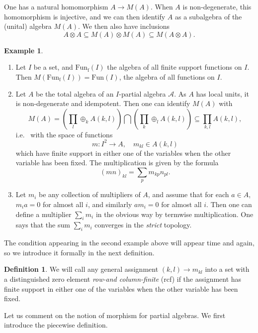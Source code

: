 \documentclass[11pt]{article}
\DeclareMathOperator{\fin}{\mathrm{f}}
\newcommand{\Fun}{\mathrm{Fun}}
\theoremstyle{definition}
\newtheorem{Def}[Theorem]{Definition}
\newtheorem{Exa}[Theorem]{Example}
\numberwithin{equation}{section}
\begin{document}
One has a natural homomorphism $A\rightarrow M(A)$. When $A$ is non-degenerate,  this homomorphism is injective, and we can then identify $A$ as a subalgebra of the (unital) algebra $M(A)$. We then also have inclusions \[A\otimes A\subseteq M(A)\otimes M(A)\subseteq M(A\otimes A).\]

\begin{Exa}\label{ExaMult} 
\begin{enumerate}
\item Let $I$ be a set, and $\Fun_{\fin}(I)$ the algebra of all finite support functions on $I$. Then $M(\Fun_{\fin}(I)) = \Fun(I)$, the algebra of all functions on $I$. 
\item Let $A$ be the total algebra of an $I$-partial algebra $\mathscr{A}$. As $A$ has local units, it is non-degenerate and idempotent. Then one can identify $M(A)$ with \[M(A) = \left(\prod_l \oplus_k A(k,l)\right) \bigcap \left(\prod_k\oplus_l A(k,l)\right) \subseteq \prod_{k,l} A(k,l),\] i.e.~ with the space of functions \[m:I^2\rightarrow A,\quad m_{kl}\in A(k,l)\] which have finite support in either one of the variables when the other variable has been fixed. The multiplication is given by the formula \[(mn)_{kl} = \sum_p m_{kp}n_{pl}.\]
\item Let $m_i$ be any collection of multipliers of $A$, and assume that for each $a\in A$, $m_ia =0$ for almost all $i$, and similarly $am_i=0$ for almost all $i$. Then one can define a multiplier $\sum_i m_i$ in the obvious way by termwise multiplication. One says that the sum $\sum_i m_i$ converges in the \emph{strict} topology. 
\end{enumerate}
\end{Exa}

The condition appearing in the second example above will appear time and again, so we introduce it formally in the next definition.

\begin{Def} We will call any general assignment $(k,l)\rightarrow m_{kl}$ into a set with a distinguished zero element \emph{row-and column-finite} (rcf) if the assignment has finite support in either one of the variables when the other variable has been fixed. 
\end{Def} 

Let us comment on the notion of morphism for partial algebras. We first introduce the piecewise definition.
\end{document}
